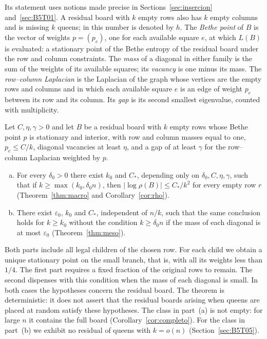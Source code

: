 Its statement uses notions made precise in Sections~\ref{sec:insercion} and~\ref{sec:B5T01}.
A residual board with $k$ empty rows also has $k$ empty columns and is missing $k$ queens;
in \cite{Completabilidad} this number is denoted by $h$.
The \emph{Bethe point} of $B$ is the vector of weights $p=(p_e)$, one for each available square
$e$, at which $L(B)$ is evaluated: a stationary point of the Bethe entropy of the residual board
under the row and column constraints. The \emph{mass} of a diagonal in either family is the sum
of the weights of its available squares; its \emph{vacancy} is one minus its mass.
The \emph{row--column Laplacian} is the Laplacian of the graph whose vertices are the empty rows
and columns and in which each available square $e$ is an edge of weight $p_e$ between its row and
its column. Its \emph{gap} is its second smallest eigenvalue, counted with multiplicity.

\begin{teorema}\label{thm:intro-consistencia}
Let $C,\eta,\gamma>0$ and let $B$ be a residual board with $k$ empty rows whose Bethe point $p$ is
stationary and interior, with row and column masses equal to one, $p_e\le C/k$, diagonal vacancies
at least $\eta$, and a gap of at least $\gamma$ for the row--column Laplacian weighted by $p$.
\begin{enumerate}[(a)]
\item For every $\delta_0>0$ there exist $k_0$ and $C_*$, depending only on $\delta_0,C,\eta,\gamma$, such
that if $k\ge\max(k_0,\delta_0n)$, then $|\log\rho(B)|\le C_*/k^2$ for every empty row $r$
(Theorem~\ref{thm:macro} and Corollary~\ref{cor:rho}).
\item There exist $\varepsilon_0$, $k_0$ and $C_*$, independent of $n/k$, such that the same conclusion
holds for $k\ge k_0$ without the condition $k\ge\delta_0n$ if the mass of each diagonal is at most
$\varepsilon_0$ (Theorem~\ref{thm:meso}).
\end{enumerate}
\end{teorema}

Both parts include all legal children of the chosen row. For each child we obtain a unique
stationary point on the small branch, that is, with all its weights less than $1/4$. The first
part requires a fixed fraction of the original rows to remain. The second dispenses with
this condition when the mass of each diagonal is small. In both cases the hypotheses concern
the residual board. The theorem is deterministic: it does not assert that the residual boards
arising when queens are placed at random satisfy these hypotheses.
The class in part~(a) is not empty: for large $n$ it contains the full board
(Corollary~\ref{cor:completo}). For the class in part~(b) we exhibit no residual of queens
with $k=o(n)$ (Section~\ref{sec:B5T05}).


